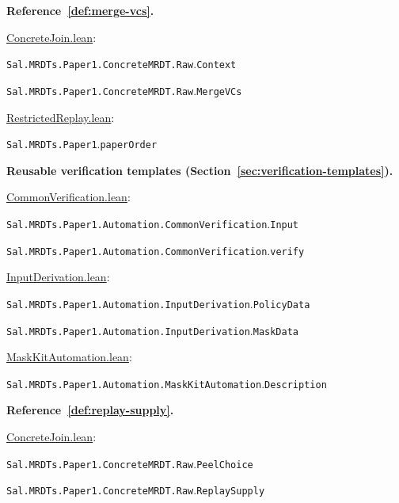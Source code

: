 \medskip\noindent\textbf{Reference~\ref{def:merge-vcs}.}\par\nobreak
\noindent\href{https://github.com/fplaunchpad/sal/blob/paper1/Sal/MRDTs/Paper1/ConcreteJoin.lean}{ConcreteJoin.lean}:\par
{\small\nolinkurl{Sal.MRDTs.Paper1.ConcreteMRDT.Raw}.\allowbreak\nolinkurl{Context}}\par
{\small\nolinkurl{Sal.MRDTs.Paper1.ConcreteMRDT.Raw}.\allowbreak\nolinkurl{MergeVCs}}\par
\noindent\href{https://github.com/fplaunchpad/sal/blob/paper1/Sal/MRDTs/Paper1/RestrictedReplay.lean}{RestrictedReplay.lean}:\par
{\small\nolinkurl{Sal.MRDTs.Paper1}.\allowbreak\nolinkurl{paperOrder}}\par

\medskip\noindent\textbf{Reusable verification templates (Section~\ref{sec:verification-templates}).}\par\nobreak
\noindent\href{https://github.com/fplaunchpad/sal/blob/paper1/Sal/MRDTs/Paper1/Automation/CommonVerification.lean}{CommonVerification.lean}:\par
{\small\nolinkurl{Sal.MRDTs.Paper1.Automation.CommonVerification}.\allowbreak\nolinkurl{Input}}\par
{\small\nolinkurl{Sal.MRDTs.Paper1.Automation.CommonVerification}.\allowbreak\nolinkurl{verify}}\par
\noindent\href{https://github.com/fplaunchpad/sal/blob/paper1/Sal/MRDTs/Paper1/Automation/InputDerivation.lean}{InputDerivation.lean}:\par
{\small\nolinkurl{Sal.MRDTs.Paper1.Automation.InputDerivation}.\allowbreak\nolinkurl{PolicyData}}\par
{\small\nolinkurl{Sal.MRDTs.Paper1.Automation.InputDerivation}.\allowbreak\nolinkurl{MaskData}}\par
\noindent\href{https://github.com/fplaunchpad/sal/blob/paper1/Sal/MRDTs/Paper1/Automation/MaskKitAutomation.lean}{MaskKitAutomation.lean}:\par
{\small\nolinkurl{Sal.MRDTs.Paper1.Automation.MaskKitAutomation}.\allowbreak\nolinkurl{Description}}\par

\medskip\noindent\textbf{Reference~\ref{def:replay-supply}.}\par\nobreak
\noindent\href{https://github.com/fplaunchpad/sal/blob/paper1/Sal/MRDTs/Paper1/ConcreteJoin.lean}{ConcreteJoin.lean}:\par
{\small\nolinkurl{Sal.MRDTs.Paper1.ConcreteMRDT.Raw}.\allowbreak\nolinkurl{PeelChoice}}\par
{\small\nolinkurl{Sal.MRDTs.Paper1.ConcreteMRDT.Raw}.\allowbreak\nolinkurl{ReplaySupply}}\par

